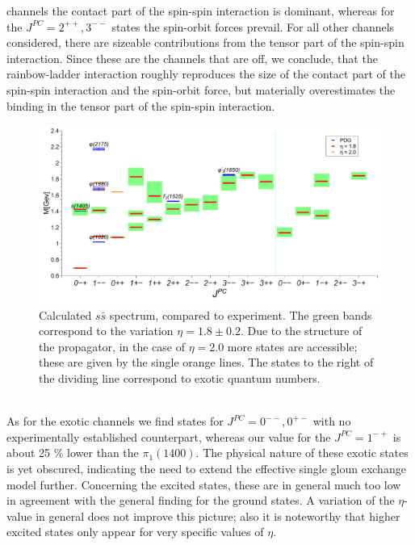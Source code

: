 channels the contact part of the spin-spin interaction is dominant, whereas for the $J^{PC}=2^{++},3^{--}$
states the spin-orbit forces prevail. For all other channels considered, there are sizeable 
contributions from the tensor part of the spin-spin interaction. Since these are the channels
that are off, we conclude, that the rainbow-ladder interaction roughly reproduces the size of
the contact part of the spin-spin interaction and the spin-orbit force, but materially overestimates
the binding in the tensor part of the spin-spin interaction. 
\begin{figure}[t]
\begin{center}
\includegraphics[width=0.999\textwidth]{figures/spectrum_ss}
\caption{ \footnotesize Calculated $s\bar{s}$ spectrum, compared to experiment. The green bands correspond to the 
variation $\eta=1.8\pm0.2$. Due to the structure of the propagator, in the case of $\eta=2.0$ more states are accessible; 
these are given by the single orange lines. The states to the right of the dividing line correspond to exotic quantum 
numbers.}\label{fig:spectrumss}
\end{center}
\end{figure}\\

As for the exotic channels we find states for $J^{PC}=0^{--},0^{+-}$ with no experimentally established
counterpart, whereas our value for the $J^{PC}=1^{-+}$ is about 25 $\%$ lower than the $\pi_1(1400)$. The physical nature of these exotic states
is yet obscured, indicating the need to extend the effective single gloun exchange model further.
Concerning the excited states, these are in general much too low \cite{Holl:2004fr}
in agreement with the general finding for the ground states. A variation of the $\eta$-value
in general does not improve this picture; also it is noteworthy that higher excited states only
appear for very specific values of $\eta$.  \\

